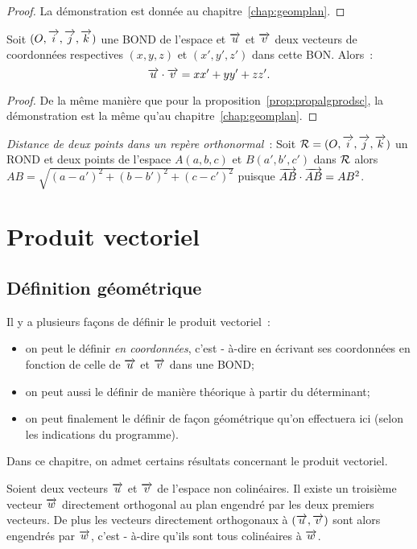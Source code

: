 \begin{proof}
  La démonstration est donnée au chapitre~\ref{chap:geomplan}.
\end{proof}

\begin{prop}
  Soit \((O,\overrightarrow{i},\overrightarrow{j},\overrightarrow{k})\) une BOND de l'espace et \(\overrightarrow{u}\) et \(\overrightarrow{v}\) deux vecteurs 
  de coordonnées respectives \((x, y, z)\) et \((x', y', z')\) dans cette 
  BON\@.  Alors~:
  \begin{equation}
    \overrightarrow{u}\cdot\overrightarrow{v} = xx' + yy' + zz'.
  \end{equation}
\end{prop}

\begin{proof}
  De la même manière que pour la proposition~\ref{prop:propalgprodsc}, la 
  démonstration est la même qu'au chapitre~\ref{chap:geomplan}.
\end{proof}

\emph{Distance de deux points dans un repère orthonormal}~: Soit \(\mathcal{R} = 
(O,\overrightarrow{i},\overrightarrow{j},\overrightarrow{k})\) un ROND et deux points de l'espace \(A(a, b, c)\) et \(B(a', b', 
c')\) dans \(\mathcal{R}\) alors \(AB = \sqrt{(a - a')^2 + (b - b')^2 + (c - c')^2}\) 
puisque \(\overrightarrow{AB}\cdot\overrightarrow{AB} = AB^2\).

\section{Produit vectoriel}
\label{sec:prodvec}

\subsection{Définition géométrique}
Il y a plusieurs façons de définir le produit vectoriel~:
\begin{itemize}
  \item on peut le définir \emph{en coordonnées}, c'est - à-dire en écrivant 
    ses coordonnées en fonction de celle de \(\overrightarrow{u}\) et \(\overrightarrow{v}\) dans une BOND;
  \item on peut aussi le définir de manière théorique à partir du déterminant;
  \item on peut finalement le définir de façon géométrique qu'on effectuera 
    ici (selon les indications du programme).
\end{itemize}

Dans ce chapitre, on admet certains résultats concernant le produit vectoriel.
\begin{prop}[admise]
  Soient deux vecteurs \(\overrightarrow{u}\) et \(\overrightarrow{v}\) de l'espace non colinéaires. Il 
  existe un troisième vecteur \(\overrightarrow{w}\) directement orthogonal au plan engendré 
  par les deux premiers vecteurs. De plus les vecteurs directement orthogonaux 
  à \((\overrightarrow{u}, \overrightarrow{v})\) sont alors engendrés par \(\overrightarrow{w}\), c'est - à-dire qu'ils 
  sont tous colinéaires à \(\overrightarrow{w}\).
\end{prop}

